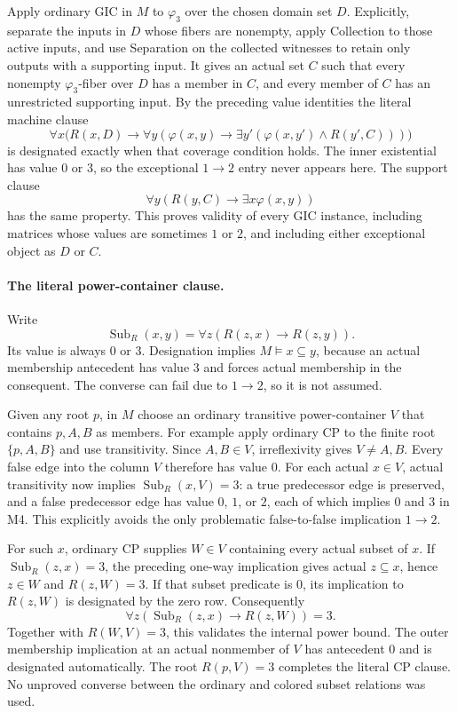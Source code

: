 Apply ordinary GIC in $M$ to $\varphi_3$ over the chosen domain set
$D$.  Explicitly, separate the inputs in $D$ whose fibers are nonempty,
apply Collection to those active inputs, and use Separation on the
collected witnesses to retain only outputs with a supporting input.
It gives an actual set $C$ such that every nonempty
$\varphi_3$-fiber over $D$ has a member in $C$, and every member of
$C$ has an unrestricted supporting input.  By the preceding value
identities the literal machine clause
\[
 \forall x\bigl(R(x,D)\to
       \forall y(\varphi(x,y)\to
           \exists y'(\varphi(x,y')\land R(y',C)))\bigr)
\]
is designated exactly when that coverage condition holds.  The
inner existential has value $0$ or $3$, so the exceptional
$1\to2$ entry never appears here.  The support clause
\[
 \forall y(R(y,C)\to\exists x\varphi(x,y))
\]
has the same property.  This proves validity of every GIC instance,
including matrices whose values are sometimes $1$ or $2$, and
including either exceptional object as $D$ or $C$.

\paragraph{The literal power-container clause.}
Write
\[
 \operatorname{Sub}_R(x,y)=\forall z(R(z,x)\to R(z,y)).
\]
Its value is always $0$ or $3$.  Designation implies
$M\models x\subseteq y$, because an actual membership antecedent
has value $3$ and forces actual membership in the consequent.
The converse can fail due to $1\to2$, so it is not assumed.

Given any root $p$, in $M$ choose an ordinary transitive
power-container $V$ that contains $p,A,B$ as members.  For example
apply ordinary CP to the finite root $\{p,A,B\}$ and use
transitivity.  Since $A,B\in V$, irreflexivity gives $V\ne A,B$.
Every false edge into the column $V$ therefore has value $0$.
For each actual $x\in V$, actual transitivity now implies
$\operatorname{Sub}_R(x,V)=3$: a true predecessor edge is preserved,
and a false predecessor edge has value $0$, $1$, or $2$, each of
which implies $0$ and $3$ in M4.  This explicitly avoids the only
problematic false-to-false implication $1\to2$.

For such $x$, ordinary CP supplies $W\in V$ containing every actual
subset of $x$.  If $\operatorname{Sub}_R(z,x)=3$, the preceding
one-way implication gives actual $z\subseteq x$, hence $z\in W$
and $R(z,W)=3$.  If that subset predicate is $0$, its implication
to $R(z,W)$ is designated by the zero row.  Consequently
\[
 \forall z(\operatorname{Sub}_R(z,x)\to R(z,W))=3.
\]
Together with $R(W,V)=3$, this validates the internal power bound.
The outer membership implication at an actual nonmember of $V$
has antecedent $0$ and is designated automatically.  The root
$R(p,V)=3$ completes the literal CP clause.  No unproved converse
between the ordinary and colored subset relations was used.

